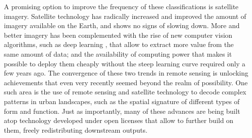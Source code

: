 \documentclass[]{interact}
\theoremstyle{plain}%
\theoremstyle{definition}
\theoremstyle{remark}
\begin{document}
A promising option to improve the frequency of these classifications is
satellite imagery.
Satellite technology has radically increased and improved the amount of
imagery available on the Earth, and shows no signs of slowing down.
More and better imagery has been complemented with the rise of new computer
vision algorithms, such as deep learning \citep{lecun2015},
that allow to extract more value from the same amount of data; and the
availability of computing power that makes it possible to deploy them cheaply
without the steep learning curve required only a few years ago.
The convergence of these two trends in remote sensing is unlocking
achievements that even very recently seemed beyond the realm of possibility.
One such area is the use of remote sensing and satellite technology to decode
complex patterns in urban landscapes, such as the spatial signature of
different types of form and function.
Just as importantly, many of these advances are being built atop
technology developed under open licenses that allow to further build on them, freely
redistributing downstream outputs.
\end{document}
